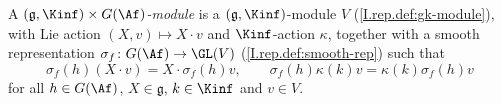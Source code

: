 A \emph{$(\mathfrak g,\Kinf)\times G(\Af)$-module} is a $(\mathfrak g,\Kinf)$-module $V$ (\cref{I.rep.def:gk-module}), with
Lie action $(X,v)\mapsto X\cdot v$ and $\Kinf$-action $\kappa$, together with a smooth representation
$\sigma_f\colon G(\Af)\to\GL(V)$ (\cref{I.rep.def:smooth-rep}) such that
\[
  \sigma_f(h)(X\cdot v)=X\cdot\sigma_f(h)v,\qquad \sigma_f(h)\kappa(k)v=\kappa(k)\sigma_f(h)v
\]
for all $h\in G(\Af)$, $X\in\mathfrak g$, $k\in\Kinf$ and $v\in V$.
